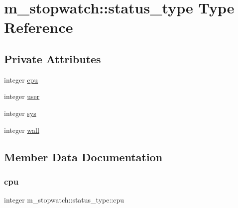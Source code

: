 \hypertarget{structm__stopwatch_1_1status__type}{}\section{m\+\_\+stopwatch\+:\+:status\+\_\+type Type Reference}
\label{structm__stopwatch_1_1status__type}
\subsection*{Private Attributes}
\begin{DoxyCompactItemize}
\item 
integer \hyperlink{structm__stopwatch_1_1status__type_ab10224f1f1e2d38a689a7e7b939b0a23}{cpu}
\item 
integer \hyperlink{structm__stopwatch_1_1status__type_a5ad3943c9cd6fc1415dc014506bc08a4}{user}
\item 
integer \hyperlink{structm__stopwatch_1_1status__type_a253e16503edd95237e9802ef9a3de68f}{sys}
\item 
integer \hyperlink{structm__stopwatch_1_1status__type_a230e090b7f8972f0bc4509cf4b5c1757}{wall}
\end{DoxyCompactItemize}


\subsection{Member Data Documentation}
\mbox{\label{structm__stopwatch_1_1status__type_ab10224f1f1e2d38a689a7e7b939b0a23}} 
\subsubsection{\texorpdfstring{cpu}{cpu}}
{\footnotesize\ttfamily integer m\+\_\+stopwatch\+::status\+\_\+type\+::cpu\hspace{0.3cm}{\ttfamily [private]}}

\mbox{\label{structm__stopwatch_1_1status__type_a253e16503edd95237e9802ef9a3de68f}} 
